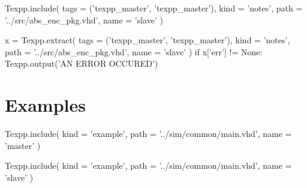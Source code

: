 \documentclass[12pt]{article}
\begin{document}
\begin{texpp}
Texpp.include(
 tags = ('texpp_master', 'texpp_master'),
 kind = 'notes',
 path = '../src/abs_enc_pkg.vhd',
 name = 'slave'
)
\end{texpp}

\begin{texpp}
x = Texpp.extract(
 tags = ('texpp_master', 'texpp_master'),
 kind = 'notes',
 path = '../src/abs_enc_pkg.vhd',
 name = 'slave'
)
if x['err'] != None: Texpp.output('AN ERROR OCCURED')
\end{texpp}


\newpage
\section{Examples}

\begin{texpp}
Texpp.include(
 kind = 'example',
 path = '../sim/common/main.vhd',
 name = 'master'
)
\end{texpp}

\begin{texpp}
Texpp.include(
 kind = 'example',
 path = '../sim/common/main.vhd',
 name = 'slave'
)
\end{texpp}
\end{document}
